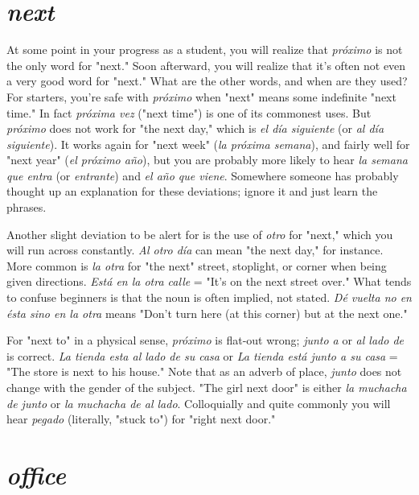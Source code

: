 \section{\emph{next}}

At some point in your progress as a student, you will realize
that \emph{próximo} is not the only word for "next." Soon afterward, you will
realize that it's often not even a very good word for "next." What are
the other words, and when are they used? For starters, you're safe with
\emph{próximo} when "next" means some indefinite "next time." In fact
\emph{próxima vez} ("next time") is one of its commonest uses. But \emph{próximo}
does not work for "the next day," which is \emph{el día siguiente} (or \emph{al día
siguiente}). It works again for "next week" (\emph{la próxima semana}), and
fairly well for "next year" (\emph{el próximo año}), but you are probably more
likely to hear \emph{la semana que entra} (or \emph{entrante}) and \emph{el año que viene}.
Somewhere someone has probably thought up an explanation for these
deviations; ignore it and just learn the phrases.

Another slight deviation to be alert for is the use of \emph{otro} for
"next," which you will run across constantly. \emph{Al otro día} can mean
"the next day," for instance. More common is \emph{la otra} for "the next"
street, stoplight, or corner when being given directions. \emph{Está en la otra
calle} = "It's on the next street over." What tends to confuse beginners
is that the noun is often implied, not stated. \emph{Dé vuelta no en ésta sino
en la otra} means "Don't turn here (at this corner) but at the next one."

For "next to" in a physical sense, \emph{próximo} is flat-out wrong;
\emph{junto a} or \emph{al lado de} is correct. \emph{La tienda esta al lado de su casa} or \emph{La
tienda está junto a su casa} = "The store is next to his house." Note
that as an adverb of place, \emph{junto} does not change with the gender of
the subject. "The girl next door" is either \emph{la muchacha de junto} or \emph{la
muchacha de al lado}. Colloquially and quite commonly you will hear
\emph{pegado} (literally, "stuck to") for "right next door."

\section{\emph{office}}

